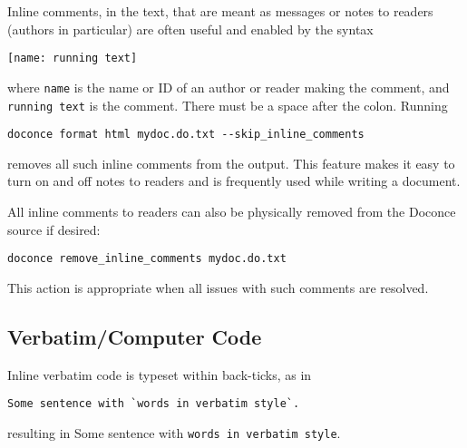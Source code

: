 \documentclass[twoside]{article}
\begin{document}
Inline comments, in the text, that are meant as messages or notes to readers
(authors in particular)
are often useful and enabled by the syntax
\begin{Verbatim}
[name: running text]
\end{Verbatim}
where {\fontsize{10pt}{10pt}\verb!name!} is the name or ID of an author or reader making the comment,
and {\fontsize{10pt}{10pt}\verb!running text!} is the comment. There must be a space after the colon.
Running
\begin{Verbatim}
doconce format html mydoc.do.txt --skip_inline_comments
\end{Verbatim}
removes all such inline comments from the output. This feature makes it easy
to turn on and off notes to readers and is frequently used while writing
a document.

All inline comments to readers can also be physically
removed from the Doconce source if desired:
\begin{Verbatim}
doconce remove_inline_comments mydoc.do.txt
\end{Verbatim}
This action is appropriate when all issues with such comments are resolved.

\subsection{Verbatim/Computer Code}

Inline verbatim code is typeset within back-ticks, as in
\begin{Verbatim}
Some sentence with `words in verbatim style`.
\end{Verbatim}
resulting in Some sentence with {\fontsize{10pt}{10pt}\verb!words in verbatim style!}.
\end{document}
